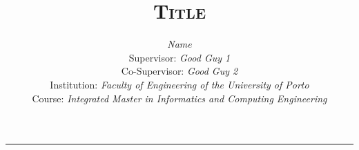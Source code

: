 \documentclass[9pt,a4paper]{extarticle}
\begin{document}
\title{\vspace*{-8mm}\textbf{\textsc{Title}}}
\author{\emph{Name}\\[2mm]
\small{Supervisor: \emph{Good Guy 1}}\\
\small{Co-Supervisor: \emph{Good Guy 2}\\
\small{Institution: \emph{Faculty of Engineering of the University of Porto}}\\
\small{Course: \emph{Integrated Master in Informatics and Computing Engineering}}}\\
\date{}
}
\maketitle
\thispagestyle{empty}


\vspace*{-4mm}\noindent\rule{\textwidth}{0.4pt}\vspace*{4mm}





\newpage


% 
\end{document}
